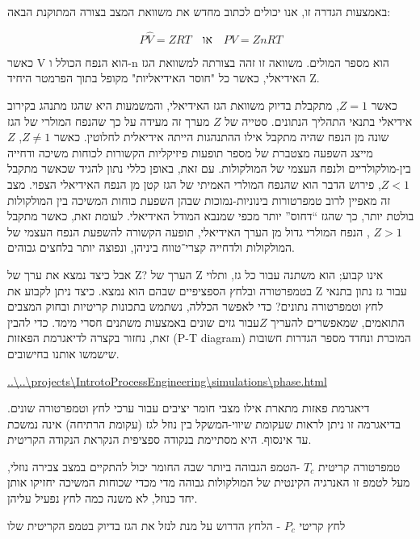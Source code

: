 \documentclass[
  hebrew,
  letterpaper,
  DIV=11,
  numbers=noendperiod]{scrreprt}
\begin{document}
באמצעות הגדרה זו, אנו יכולים לכתוב מחדש את משוואת המצב בצורה המתוקנת
הבאה:

\[P\widehat{V} = ZRT\quad\text{או}\quad PV = ZnRT\]

כאשר V הוא הנפח הכולל ו-n הוא מספר המולים. משוואה זו זהה בצורתה למשוואת
הגז האידיאלי, כאשר כל "חוסר האידיאליות" מקופל בתוך הפרמטר היחיד Z.

כאשר \(Z = 1\), מתקבלת בדיוק משוואת הגז האידיאלי, והמשמעות היא שהגז
מתנהג בקירוב אידיאלי בתנאי התהליך הנתונים. סטייה של \(Z\) מערך זה מעידה
על כך שהנפח המולרי של הגז שונה מן הנפח שהיה מתקבל אילו ההתנהגות הייתה
אידיאלית לחלוטין. כאשר \(Z \neq 1\), \(Z\) מייצג השפעה מצטברת של מספר
תופעות פיזיקליות הקשורות לכוחות משיכה ודחייה בין-מולקולריים ולנפח העצמי
של המולקולות. עם זאת, באופן כללי נתון להגיד שכאשר מתקבל \(Z < 1\), פירוש
הדבר הוא שהנפח המולרי האמיתי של הגז קטן מן הנפח האידיאלי הצפוי. מצב זה
מאפיין לרוב טמפרטורות בינוניות-נמוכות שבהן השפעת כוחות המשיכה בין
המולקולות בולטת יותר, כך שהגז ``דחוס'' יותר מכפי שמנבא המודל האידיאלי.
לעומת זאת, כאשר מתקבל \(Z > 1\) , הנפח המולרי גדול מן הערך האידיאלי,
תופעה הקשורה להשפעת הנפח העצמי של המולקולות ולדחייה קצרי־טווח ביניהן,
ונפוצה יותר בלחצים גבוהים.

אבל כיצד נמצא את ערך של Z? הערך של Z אינו קבוע; הוא משתנה עבור כל גז,
ותלוי בטמפרטורה ובלחץ הספציפיים שבהם הוא נמצא. כיצד ניתן לקבוע את Z עבור
גז נתון בתנאי לחץ וטמפרטורה נתונים? כדי לאפשר הכללה, נשתמש בתכונות
קריטיות ובחוק המצבים התואמים, שמאפשרים להעריך \(Z\)עבור גזים שונים
באמצעות משתנים חסרי מימד. כדי להבין זאת, נחזור בקצרה לדיאגרמת הפאזות
(P-T diagram) המוכרת ונחדד מספר הגדרות חשובות שישמשו אותנו בחישובים.

\href{../../projects/IntrotoProcessEngineering/simulations/phase.html}{..\textbackslash..\textbackslash projects\textbackslash IntrotoProcessEngineering\textbackslash simulations\textbackslash phase.html}

דיאגרמת פאזות מתארת אילו מצבי חומר יציבים עבור ערכי לחץ וטמפרטורה שונים.
בדיאגרמה זו ניתן לראות שעקומת שיווי-המשקל בין נוזל לגז (עקומת הרתיחה)
אינה נמשכת עד אינסוף. היא מסתיימת בנקודה ספציפית הנקראת הנקודה הקריטית.

טמפרטורה קריטית \(T_{c}\) -הטמפ\textquotesingle{} הגבוהה ביותר שבה החומר
יכול להתקיים במצב צבירה נוזלי, מעל לטמפ\textquotesingle{} זו האנרגיה
הקינטית של המולקולות גבוהה מדי מכדי שכוחות המשיכה יחזיקו אותן יחד כנוזל,
לא משנה כמה לחץ נפעיל עליהן.

לחץ קריטי \(P_{c}\) - הלחץ הדרוש על מנת לנזל את הגז בדיוק
בטמפ\textquotesingle{} הקריטית שלו
\end{document}
